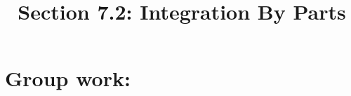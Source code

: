 \documentclass[noinstructornotes]{ximera}
\title{Section 7.2: Integration By Parts}
\begin{document}
\begin{abstract}		\end{abstract}
\maketitle



\begin{comment}
\section{Warm up:}

	\begin{freeResponse}
	
	\end{freeResponse}
	
\begin{instructorNotes}

\end{instructorNotes}
\end{comment}







\section{Group work:}
\end{document}
